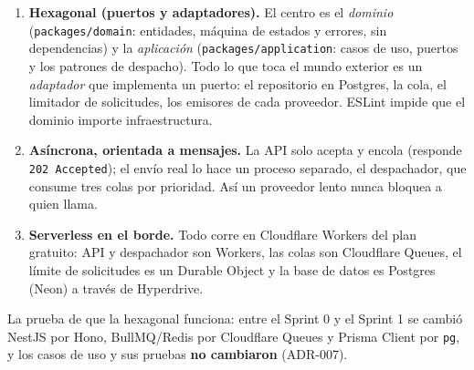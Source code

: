 \documentclass[11pt,a4paper]{article}
\begin{document}
\begin{enumerate}
  \item \textbf{Hexagonal (puertos y adaptadores).} El centro es el \emph{dominio} (\texttt{packages/domain}:
        entidades, máquina de estados y errores, sin dependencias) y la \emph{aplicación}
        (\texttt{packages/application}: casos de uso, puertos y los patrones de despacho). Todo lo que toca el mundo
        exterior es un \emph{adaptador} que implementa un puerto: el repositorio en Postgres, la cola, el limitador
        de solicitudes, los emisores de cada proveedor. ESLint impide que el dominio importe infraestructura.
  \item \textbf{Asíncrona, orientada a mensajes.} La API solo acepta y encola (responde \texttt{202 Accepted}); el
        envío real lo hace un proceso separado, el despachador, que consume tres colas por prioridad. Así un proveedor
        lento nunca bloquea a quien llama.
  \item \textbf{Serverless en el borde.} Todo corre en Cloudflare Workers del plan gratuito: API y despachador son
        Workers, las colas son Cloudflare Queues, el límite de solicitudes es un Durable Object y la base de datos
        es Postgres (Neon) a través de Hyperdrive.
\end{enumerate}

La prueba de que la hexagonal funciona: entre el Sprint 0 y el Sprint 1 se cambió NestJS por Hono, BullMQ/Redis por
Cloudflare Queues y Prisma Client por \texttt{pg}, y los casos de uso y sus pruebas \textbf{no cambiaron} (ADR-007).
\end{document}

